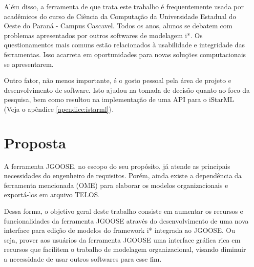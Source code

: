             Além disso,
            a ferramenta de que trata este trabalho
            é frequentemente usada por acadêmicos do curso de Ciência da Computação da Universidade Estadual do Oeste do Paraná - Campus Cascavel.
            Todos os anos, alunos se debatem com problemas apresentados por outros softwares de modelagem i*.
            Os questionamentos mais comuns estão relacionados à usabilidade e integridade das ferramentas.
            Isso acarreta em oportunidades para novas soluções computacionais se apresentarem.

            Outro fator, não menos importante,
            é o gosto pessoal pela área de projeto e desenvolvimento de software.
            Isto ajudou na tomada de decisão quanto ao foco da pesquisa, bem como resultou na implementação de uma API para o iStarML (Veja o apêndice \ref{apendice:istarml}).
    \section{Proposta}
        \label{cap:introducao:sec:proposta}
            A ferramenta JGOOSE,
            no escopo do seu propósito,
            já atende as principais necessidades do engenheiro de requisitos.
            Porém, ainda existe a dependência da ferramenta mencionada (OME)
            para elaborar os modelos organizacionais e exportá-los em arquivo TELOS.

            Dessa forma, o objetivo geral deste trabalho
            consiste em
            aumentar os recursos e funcionalidades da ferramenta JGOOSE através do
            desenvolvimento de uma nova interface
            para edição de modelos do framework i*
            integrada ao JGOOSE.
            Ou seja, prover aos usuários da ferramenta JGOOSE uma interface gráfica rica em recursos que facilitem o trabalho de modelagem organizacional, visando diminuir a necessidade de usar outros softwares para esse fim.
            
